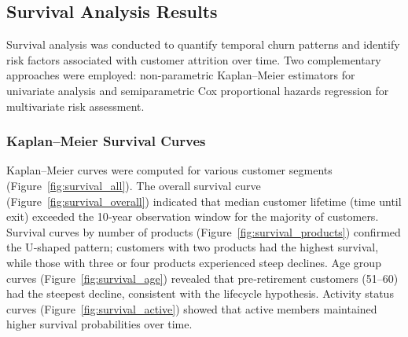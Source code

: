 \documentclass[12pt]{article}
\begin{document}
\subsection{Survival Analysis Results}
Survival analysis was conducted to quantify temporal churn patterns and identify risk factors associated with customer attrition over time. Two complementary approaches were employed: non-parametric Kaplan–Meier estimators for univariate analysis and semiparametric Cox proportional hazards regression for multivariate risk assessment.

\subsubsection{Kaplan–Meier Survival Curves}
Kaplan–Meier curves were computed for various customer segments (Figure~\ref{fig:survival_all}). The overall survival curve (Figure~\ref{fig:survival_overall}) indicated that median customer lifetime (time until exit) exceeded the 10‑year observation window for the majority of customers. Survival curves by number of products (Figure~\ref{fig:survival_products}) confirmed the U‑shaped pattern; customers with two products had the highest survival, while those with three or four products experienced steep declines. Age group curves (Figure~\ref{fig:survival_age}) revealed that pre‑retirement customers (51–60) had the steepest decline, consistent with the lifecycle hypothesis. Activity status curves (Figure~\ref{fig:survival_active}) showed that active members maintained higher survival probabilities over time.
\end{document}
